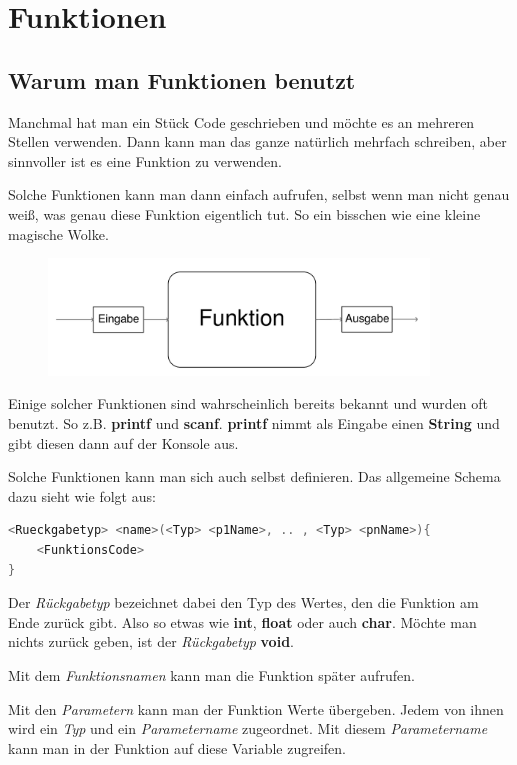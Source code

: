 \documentclass[c_worksheet.tex]{subfiles}
\begin{document}
\chapter{Funktionen}


\section{Warum man Funktionen benutzt} 

Manchmal hat man ein Stück Code geschrieben und möchte es an mehreren Stellen verwenden. Dann kann man das ganze natürlich mehrfach schreiben, aber sinnvoller ist es eine Funktion zu verwenden.

Solche Funktionen kann man dann einfach aufrufen, selbst wenn man nicht genau weiß, was genau diese Funktion eigentlich tut. So ein bisschen wie eine kleine magische Wolke.

\begin{figure}[h]
\center
\includegraphics[width=0.9\textwidth]{Grafiken/Funktionen/function}
\end{figure}

Einige solcher Funktionen sind wahrscheinlich bereits bekannt und wurden oft benutzt. So z.B. \textbf{printf} und \textbf{scanf}. \textbf{printf} nimmt als Eingabe einen \textbf{String} und gibt diesen dann auf der Konsole aus.

Solche Funktionen kann man sich auch selbst definieren. Das allgemeine Schema dazu sieht wie folgt aus:

\begin{lstlisting}[language=c]
<Rueckgabetyp> <name>(<Typ> <p1Name>, .. , <Typ> <pnName>){
	<FunktionsCode>
}
\end{lstlisting}

Der \emph{Rückgabetyp} bezeichnet dabei den Typ des Wertes, den die Funktion am Ende zurück gibt. Also so etwas wie \textbf{int}, \textbf{float} oder auch \textbf{char}. Möchte man nichts zurück geben, ist der \emph{Rückgabetyp} \textbf{void}.

Mit dem \emph{Funktionsnamen} kann man die Funktion später aufrufen.

Mit den \emph{Parametern} kann man der Funktion Werte übergeben. Jedem von ihnen wird ein \emph{Typ} und ein \emph{Parametername} zugeordnet. Mit diesem \emph{Parametername} kann man in der Funktion auf diese Variable zugreifen.
\end{document}
